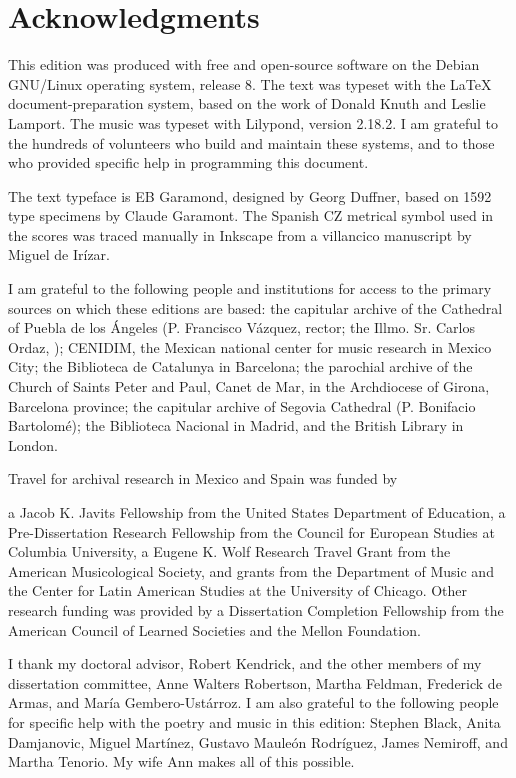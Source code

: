 \section{Acknowledgments}

This edition was produced with free and open-source software on the Debian GNU/Linux operating system, release 8.
The text was typeset with the \LaTeX{} document-preparation system, based on the work of Donald Knuth and Leslie Lamport.
The music was typeset with Lilypond, version 2.18.2.
I am grateful to the hundreds of volunteers who build and maintain these systems, and to those who provided specific help in programming this document.

The text typeface is EB Garamond, designed by Georg Duffner, based on 1592 type specimens by Claude Garamont.
The Spanish CZ metrical symbol used in the scores was traced manually in Inkscape from a villancico manuscript by Miguel de Irízar.

I am grateful to the following people and institutions for access to the primary sources on which these editions are based: 
the capitular archive of the Cathedral of Puebla de los Ángeles (P. Francisco Vázquez, rector; the Illmo. Sr. Carlos Ordaz, );
CENIDIM, the Mexican national center for music research in Mexico City;
the Biblioteca de Catalunya in Barcelona;
the parochial archive of the Church of Saints Peter and Paul, Canet de Mar, in the Archdiocese of Girona, Barcelona province;
the capitular archive of Segovia Cathedral (P. Bonifacio Bartolomé);
the Biblioteca Nacional in Madrid, and
the British Library in London.

Travel for archival research in Mexico and Spain was funded by 
\begin{anonymize}
a Jacob K. Javits Fellowship from the United States Department of Education, 
a Pre-Dissertation Research Fellowship from the Council for European Studies at Columbia University, 
a Eugene K. Wolf Research Travel Grant from the American Musicological Society, 
and grants from the Department of Music and the Center for Latin American Studies at the University of Chicago.
Other research funding was provided by a Dissertation Completion Fellowship from the American Council of Learned Societies and the Mellon Foundation.

I thank my doctoral advisor, Robert Kendrick, and the other members of my dissertation committee, Anne Walters Robertson, Martha Feldman, Frederick de Armas, and María Gembero-Ustárroz.
I am also grateful to the following people for specific help with the poetry and music in this edition:
Stephen Black,
Anita Damjanovic, 
Miguel Martínez, 
Gustavo Mauleón Rodríguez,
James Nemiroff, and
Martha Tenorio.
My wife Ann makes all of this possible.
\end{anonymize}
